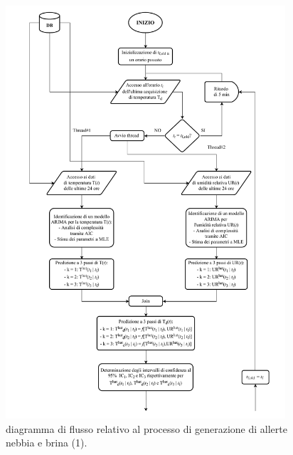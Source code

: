 \begin{figure}[h!]
	\centering
	\includegraphics[height=580px]{FlowChartsFiles/Allerte_nebbia_&_brina_1.pdf}
	\caption[Diagramma di flusso relativo al processo di generazione di allerte nebbia e brina (1)]{diagramma di flusso relativo al processo di generazione di allerte nebbia e brina (1).}
	\label{Allerta_nebbia_&_brina_1}
\end{figure}
